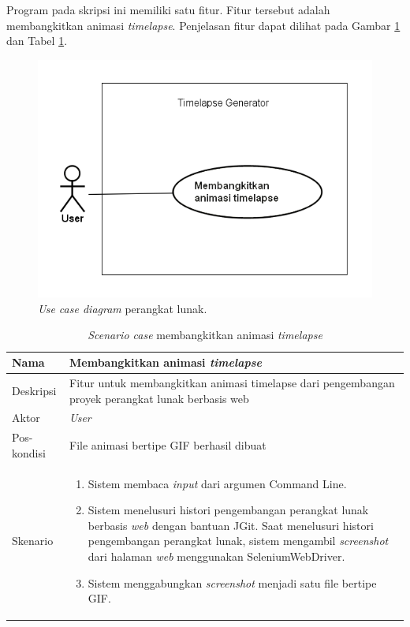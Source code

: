  
Program pada skripsi ini memiliki satu fitur. Fitur tersebut adalah membangkitkan animasi \textit{timelapse}.
Penjelasan fitur dapat dilihat pada Gambar \ref{fig:uc} dan Tabel \ref{tab:tabel_sc_animasi}.


\begin{figure}[H]
	\centering
		\includegraphics[scale=0.8]{Gambar/UseCaseDiagram1.png}
	\caption{\textit{Use case diagram} perangkat lunak.}
	\label{fig:uc}
\end{figure}
\begin{table}[]
    \centering
    \begin{tabular}{|p{3cm}|p{10cm}|}
    \hline
        Nama & Membangkitkan animasi \textit{timelapse}\\
    \hline
    \hline
        Deskripsi & Fitur untuk membangkitkan animasi timelapse dari pengembangan proyek perangkat lunak berbasis web\\
    \hline
        Aktor & \textit{User} \\
    \hline
        Pos-kondisi &  File animasi bertipe GIF berhasil dibuat\\
    \hline
        Skenario & 
        \begin{enumerate}
        \item Sistem membaca \textit{input} dari argumen Command Line.
            \item Sistem menelusuri histori pengembangan perangkat lunak berbasis \textit{web} dengan bantuan
JGit. Saat menelusuri histori pengembangan perangkat lunak, sistem mengambil \textit{screenshot} dari halaman \textit{web} menggunakan SeleniumWebDriver.
            \item Sistem menggabungkan \textit{screenshot} menjadi satu file bertipe GIF.
        \end{enumerate}\\
    \hline
    \end{tabular}
    \caption{\textit{Scenario case} membangkitkan animasi \textit{timelapse}}
    \label{tab:tabel_sc_animasi}
\end{table}


